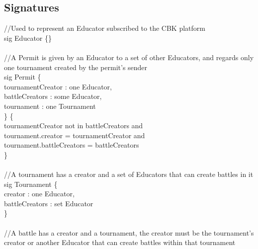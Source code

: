 \documentclass{article}
\begin{document}
{\subsection{Signatures}
\color{gray}
//Used to represent an Educator subscribed to the CBK platform \\
\color{blue}
sig
\color{black}
Educator  \{\} \\
\\
\color{gray}
//A Permit is given by an Educator to a set of other Educators, and regards only one tournament created by the permit's sender\\
\color{blue}
sig
\color{black}
Permit \{\\
\-\hspace{1cm}    tournamentCreator : \color{blue} one \color{black} Educator,\\
\-\hspace{1cm}    battleCreators : \color{blue} some \color{black} Educator,\\
\-\hspace{1cm}    tournament : \color{blue} one \color{black} Tournament\\
\}	\{\\
\-\hspace{1cm}    tournamentCreator \color{blue} not in \color{black} battleCreators \color{blue} and \color{black}\\
\-\hspace{1cm}    tournament.creator \color{blue} = \color{black} tournamentCreator \color{blue} and \color{black}\\
\-\hspace{1cm}    tournament.battleCreators \color{blue} = \color{black} battleCreators\\
\}\\
\\
\color{gray}
//A tournament has a creator and a set of Educators that can create battles in it\\
\color{blue}
sig
\color{black}
Tournament \{ \\
\-\hspace{1cm}    creator : \color{blue} one \color{black} Educator,\\
\-\hspace{1cm}    battleCreators : \color{blue} set \color{black} Educator\\
\}\\
\color{gray}
\\
//A battle has a creator and a tournament, the creator must be the tournament's creator or another Educator that can create battles within that tournament\\
}
\end{document}
